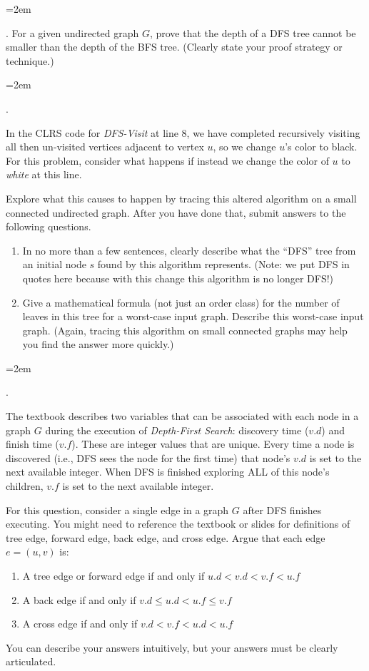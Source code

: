 \documentclass[12pt]{article}
\newcounter{quesnum}
\newcommand{\question}[2][??]{
\begin{list}{\labelitemi}{\leftmargin=2em}
\item [\arabic{quesnum}.] {#2}
\end{list}
\addtocounter{quesnum}{1}
}
\newcommand{\answer}[2][??]{ 
\ifthenelse{\boolean{solution}}{
\color{red} #2 \color{black}}
{\vspace*{#1}}
}
\begin{document}
\answer[0.25in]{...}

\question[1]{
 For a given undirected graph $G$, prove that the depth of a DFS tree cannot be smaller than the depth of the BFS tree.  (Clearly state your proof strategy or technique.)
}

\question[1]{
In the CLRS code for {\em DFS-Visit} at line 8,  we have completed recursively visiting all then un-visited vertices adjacent to vertex $u$, so we change $u$'s color to black.  For this problem, consider what happens if instead we change the color of $u$ to {\em white} at this line.

Explore what this causes to happen by tracing this altered algorithm on a small connected undirected graph.  After you have done that, submit answers to the following questions.

\begin{enumerate}
\renewcommand{\theenumi}{\Alph{enumi}}
\item In no more than a few sentences, clearly describe what the ``DFS'' tree from an initial node $s$ found by this algorithm represents.  (Note:  we put DFS in quotes here because with this change this algorithm is no longer DFS!)
\item Give a mathematical formula (not just an order class) for the number of leaves in this tree for a worst-case input graph.  Describe this worst-case input graph.  (Again, tracing this algorithm on small connected graphs may help you find the answer more quickly.)
\end{enumerate}

}

\question[1]{
The textbook describes two variables that can be associated with each node in a graph $G$ during the execution of \emph{Depth-First Search}: discovery time ($v.d$) and finish time ($v.f$). These are integer values that are unique. Every time a node is discovered (i.e., DFS sees the node for the first time) that node's $v.d$ is set to the next available integer. When DFS is finished exploring ALL of this node's children, $v.f$ is set to the next available integer.

For this question, consider a single edge in a graph $G$ after DFS finishes executing. You might need to reference the textbook or slides for definitions of tree edge, forward edge, back edge, and cross edge. Argue that each edge $e=(u,v)$ is:

\begin{enumerate}
\item A tree edge or forward edge if and only if $u.d < v.d < v.f < u.f$
\item A back edge if and only if $v.d \leq u.d < u.f \leq v.f$
\item A cross edge if and only if $v.d < v.f < u.d < u.f$
\end{enumerate}

You can describe your answers intuitively, but your answers must be clearly articulated.
}
\end{document}
